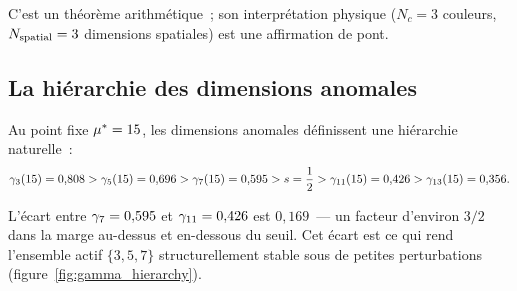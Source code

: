 \documentclass[12pt,a4paper]{article}
\begin{document}
C'est un théorème arithmétique~; son interprétation physique
($N_c = 3$ couleurs, $N_{\rm spatial} = 3$ dimensions spatiales)
est une affirmation de pont.

\subsection{La hiérarchie des dimensions anomales}
\label{sec:ch8_hierarchy}

Au point fixe ${\mu^{*}} = 15$, les dimensions anomales définissent
une hiérarchie naturelle~:
\begin{equation}
  \gamma_{3}(15) = 0{,}808 > \gamma_{5}(15) = 0{,}696 > \gamma_{7}(15) = 0{,}595
  > s = \frac{1}{2} > \gamma_{11}(15) = 0{,}426 > \gamma_{13}(15) = 0{,}356.
  \label{eq:gamma_hierarchy}
\end{equation}

L'écart entre $\gamma_{7} = 0{,}595$ et $\gamma_{11} = 0{,}426$ est
$0{,}169$~--- un facteur d'environ $3/2$ dans la marge au-dessus et
en-dessous du seuil. Cet écart est ce qui rend l'ensemble actif
$\{3,5,7\}$ structurellement stable sous de petites perturbations
(figure~\ref{fig:gamma_hierarchy}).
\end{document}
